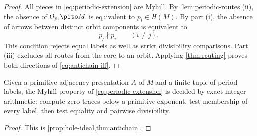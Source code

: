 \begin{proof}
All pieces in \eqref{eq:periodic-extension} are Myhill.  By
\cref{lem:periodic-routes}(ii), the absence of $O_{p_i}\pito M$ is equivalent
to $p_i\in H(M)$.  By part (i), the absence of arrows between distinct orbit
components is equivalent to
\[
  p_j\nmid p_i\qquad(i\ne j).
\]
This condition rejects equal labels as well as strict divisibility
comparisons.  Part (iii) excludes all routes from the core to an orbit.
Applying \cref{thm:routing} proves both directions of
\eqref{eq:antichain-iff}.
\end{proof}

\begin{corollary}
\label{cor:finite-decision}
Given a primitive adjacency presentation $A$ of $M$ and a finite tuple of
period labels, the Myhill property of \eqref{eq:periodic-extension} is decided
by exact integer arithmetic: compute zero traces below a primitive exponent,
test membership of every label, then test equality and pairwise divisibility.
\end{corollary}

\begin{proof}
This is \cref{prop:hole-ideal,thm:antichain}.
\end{proof}

